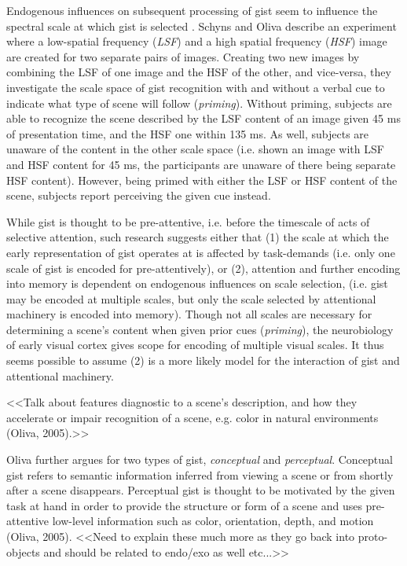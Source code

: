 Endogenous influences on subsequent processing of gist seem to influence the spectral scale at which gist is selected \cite{Schyns1994,Oliva1997}.  Schyns and Oliva describe an experiment where a low-spatial frequency (\textit{LSF}) and a high spatial frequency (\textit{HSF}) image are created for two separate pairs of images.  Creating two new images by combining the LSF of one image and the HSF of the other, and vice-versa, they investigate the scale space of gist recognition with and without a verbal cue to indicate what type of scene will follow (\textit{priming}).  Without priming, subjects are able to recognize the scene described by the LSF content of an image given 45 ms of presentation time, and the HSF one within 135 ms.  As well, subjects are unaware of the content in the other scale space (i.e. shown an image with LSF and HSF content for 45 ms, the participants are unaware of there being separate HSF content).  However, being primed with either the LSF or HSF content of the scene, subjects report perceiving the given cue instead.  

While gist is thought to be pre-attentive, i.e. before the timescale of acts of selective attention, such research suggests either that (1) the scale at which the early representation of gist operates at is affected by task-demands (i.e. only one scale of gist is encoded for pre-attentively), or (2), attention and further encoding into memory is dependent on endogenous influences on scale selection, (i.e. gist may be encoded at multiple scales, but only the scale selected by attentional machinery is encoded into memory).  Though not all scales are necessary for determining a scene's content when given prior cues (\textit{priming}), the neurobiology of early visual cortex gives scope for encoding of multiple visual scales.  It thus seems possible to assume (2) is a more likely model for the interaction of gist and attentional machinery.

<<Talk about features diagnostic to a scene's description, and how they accelerate or impair recognition of a scene, e.g. color in natural environments (Oliva, 2005).>>

Oliva further argues for two types of gist, \textit{conceptual} and \textit{perceptual}.  Conceptual gist refers to semantic information inferred from viewing a scene or from shortly after a scene disappears. Perceptual gist is thought to be motivated by the given task at hand in order to provide the structure or form of a scene and uses pre-attentive low-level information such as color, orientation, depth, and motion (Oliva, 2005).  <<Need to explain these much more as they go back into proto-objects and should be related to endo/exo as well etc...>>
	
